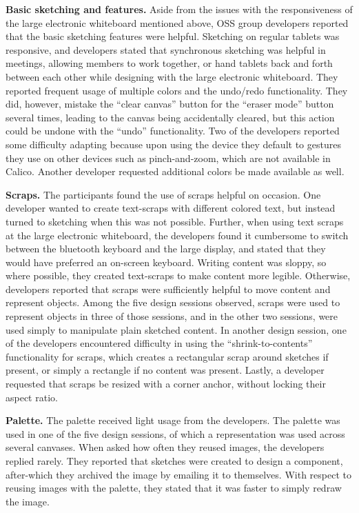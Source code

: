 \textbf{Basic sketching and features.} Aside from the issues with the responsiveness of the large electronic whiteboard mentioned above, OSS group developers reported that the basic sketching features were helpful. Sketching on regular tablets was responsive, and developers stated that synchronous sketching was helpful in meetings, allowing members to work together, or hand tablets back and forth between each other while designing with the large electronic whiteboard. They reported frequent usage of multiple colors and the undo/redo functionality.  They did, however, mistake the ``clear canvas'' button for the ``eraser mode'' button several times, leading to the canvas being accidentally cleared, but this action could be undone with the ``undo'' functionality. Two of the developers reported some difficulty adapting because upon using the device they default to gestures they use on other devices such as pinch-and-zoom, which are not available in Calico.
Another developer requested additional colors be made available as well.

\textbf{Scraps.} The participants found the use of scraps helpful on occasion. One developer wanted to create text-scraps with different colored text, but instead turned to sketching when this was not possible. Further, when using text scraps at the large electronic whiteboard, the developers found it cumbersome to switch between the bluetooth keyboard and the large display, and stated that they would have preferred an on-screen keyboard. Writing content was sloppy, so where possible, they created text-scraps to make content more legible. Otherwise, developers reported that scraps were sufficiently helpful to move content and represent objects. Among the five design sessions observed, scraps were used to represent objects in three of those sessions, and in the other two sessions, were used simply to manipulate plain sketched content.  In another design session, one of the developers encountered difficulty in using the ``shrink-to-contents'' functionality for scraps, which creates a rectangular scrap around sketches if present, or simply a rectangle if no content was present. Lastly, a developer requested that scraps be resized with a corner anchor, without locking their aspect ratio.

\textbf{Palette.} The palette received light usage from the developers. The palette was used in one of the five design sessions, of which a representation was used across several canvases. When asked how often they reused images, the developers replied rarely. They reported that sketches were created to design a component, after-which they archived the image by emailing it to themselves. With respect to reusing images with the palette, they stated that it was faster to simply redraw the image.

